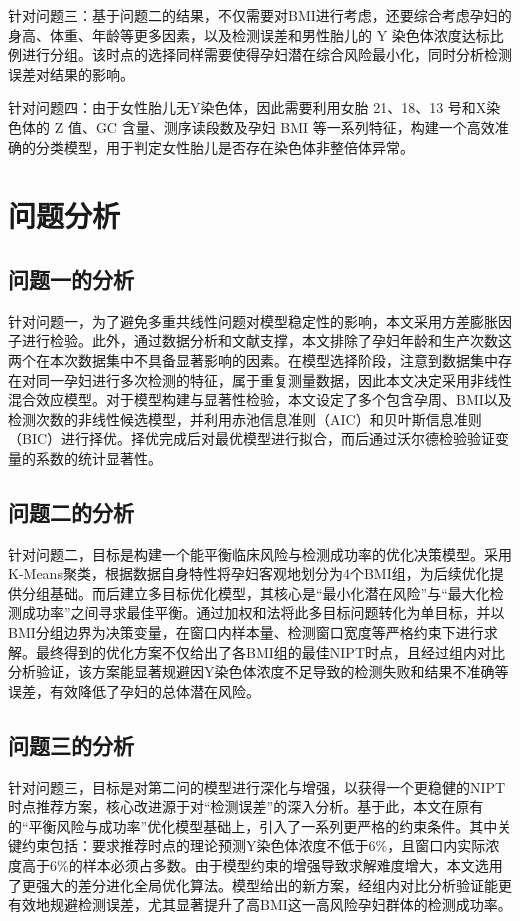 \documentclass[a4paper, oneside, 12pt]{article}
\begin{document}
针对问题三：基于问题二的结果，不仅需要对BMI进行考虑，还要综合考虑孕妇的身高、体重、年龄等更多因素，以及检测误差和男性胎儿的 Y 染色体浓度达标比例进行分组。该时点的选择同样需要使得孕妇潜在综合风险最小化，同时分析检测误差对结果的影响。

针对问题四：由于女性胎儿无Y染色体，因此需要利用女胎 21、18、13 号和X染色体的 Z 值、GC 含量、测序读段数及孕妇 BMI 等一系列特征，构建一个高效准确的分类模型，用于判定女性胎儿是否存在染色体非整倍体异常。

\section{问题分析}

\subsection{问题一的分析}

针对问题一，为了避免多重共线性问题对模型稳定性的影响，本文采用方差膨胀因子进行检验。此外，通过数据分析和文献支撑，本文排除了孕妇年龄和生产次数这两个在本次数据集中不具备显著影响的因素。在模型选择阶段，注意到数据集中存在对同一孕妇进行多次检测的特征，属于重复测量数据，因此本文决定采用非线性混合效应模型。对于模型构建与显著性检验，本文设定了多个包含孕周、BMI以及检测次数的非线性候选模型，并利用赤池信息准则（AIC）和贝叶斯信息准则（BIC）进行择优。择优完成后对最优模型进行拟合，而后通过沃尔德检验验证变量的系数的统计显著性。

\subsection{问题二的分析}
针对问题二，目标是构建一个能平衡临床风险与检测成功率的优化决策模型。采用K-Means聚类，根据数据自身特性将孕妇客观地划分为4个BMI组，为后续优化提供分组基础。而后建立多目标优化模型，其核心是“最小化潜在风险”与“最大化检测成功率”之间寻求最佳平衡。通过加权和法将此多目标问题转化为单目标，并以BMI分组边界为决策变量，在窗口内样本量、检测窗口宽度等严格约束下进行求解。最终得到的优化方案不仅给出了各BMI组的最佳NIPT时点，且经过组内对比分析验证，该方案能显著规避因Y染色体浓度不足导致的检测失败和结果不准确等误差，有效降低了孕妇的总体潜在风险。

\subsection{问题三的分析}
针对问题三，目标是对第二问的模型进行深化与增强，以获得一个更稳健的NIPT时点推荐方案，核心改进源于对“检测误差”的深入分析。基于此，本文在原有的“平衡风险与成功率”优化模型基础上，引入了一系列更严格的约束条件。其中关键约束包括：要求推荐时点的理论预测Y染色体浓度不低于6\%，且窗口内实际浓度高于6\%的样本必须占多数。由于模型约束的增强导致求解难度增大，本文选用了更强大的差分进化全局优化算法。模型给出的新方案，经组内对比分析验证能更有效地规避检测误差，尤其显著提升了高BMI这一高风险孕妇群体的检测成功率。
\end{document}
